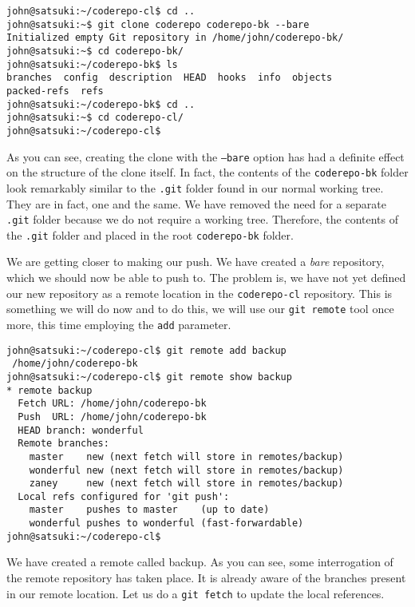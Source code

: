 \begin{Verbatim}[frame=leftline,framerule=1mm,fontsize=\relsize{-3}] 
john@satsuki:~/coderepo-cl$ cd ..
john@satsuki:~$ git clone coderepo coderepo-bk --bare
Initialized empty Git repository in /home/john/coderepo-bk/
john@satsuki:~$ cd coderepo-bk/
john@satsuki:~/coderepo-bk$ ls
branches  config  description  HEAD  hooks  info  objects  
packed-refs  refs
john@satsuki:~/coderepo-bk$ cd ..
john@satsuki:~$ cd coderepo-cl/
john@satsuki:~/coderepo-cl$ 
\end{Verbatim}

As you can see, creating the clone with the \texttt{--bare} option has had a definite effect on the structure of the clone itself.  In fact, the contents of the \texttt{coderepo-bk} folder look remarkably similar to the \texttt{.git} folder found in our normal working tree.  They are in fact, one and the same.  We have removed the need for a separate \texttt{.git} folder because we do not require a working tree.  Therefore, the contents of the \texttt{.git} folder and placed in the root \texttt{coderepo-bk} folder.

We are getting closer to making our push.  We have created a \emph{bare} repository, which we should now be able to push to.  The problem is, we have not yet defined our new repository as a remote location in the \texttt{coderepo-cl} repository.  This is something we will do now and to do this, we will use our \texttt{git remote} tool once more, this time employing the \texttt{add} parameter.

\begin{Verbatim}[frame=leftline,framerule=1mm,fontsize=\relsize{-3}] 
john@satsuki:~/coderepo-cl$ git remote add backup 
 /home/john/coderepo-bk
john@satsuki:~/coderepo-cl$ git remote show backup
* remote backup
  Fetch URL: /home/john/coderepo-bk
  Push  URL: /home/john/coderepo-bk
  HEAD branch: wonderful
  Remote branches:
    master    new (next fetch will store in remotes/backup)
    wonderful new (next fetch will store in remotes/backup)
    zaney     new (next fetch will store in remotes/backup)
  Local refs configured for 'git push':
    master    pushes to master    (up to date)
    wonderful pushes to wonderful (fast-forwardable)
john@satsuki:~/coderepo-cl$ 
\end{Verbatim}

We have created a remote called backup.  As you can see, some interrogation of the remote repository has taken place.  It is already aware of the branches present in our remote location.  Let us do a \texttt{git fetch} to update the local references.

